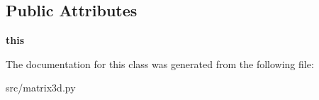 \subsection*{Public Attributes}
\begin{DoxyCompactItemize}
\item 
\hypertarget{classmatrix3d_1_1Matrix3D_adb19e1ac1341d747d9f7a9e70e89f053}{
{\bfseries this}}
\label{d4/dbb/classmatrix3d_1_1Matrix3D_adb19e1ac1341d747d9f7a9e70e89f053}

\end{DoxyCompactItemize}


The documentation for this class was generated from the following file:\begin{DoxyCompactItemize}
\item 
src/matrix3d.py\end{DoxyCompactItemize}
